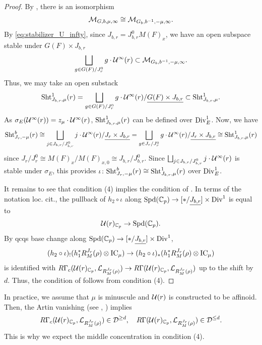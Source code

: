 \documentclass[12pt,reqno]{amsart}
\begin{document}
\begin{proof}
    By \cite[Corollary 23.3.2]{SW20}, there is an isomorphism
    \[
        {\mathcal{M}}_{G, b, \mu, \infty} \cong {\mathcal{M}}_{G_b, b^{-1}, -\mu, \infty}. 
    \]
    By \eqref{eq:stabilizer_U_infty}, since $J_{b, r} = J_{b, r}^0 M(F)_x$, we have an open subspace stable under $G(F) \times J_{b, r}$
    \[
        \bigsqcup_{g \in G(F) / J_{r}^0} g \cdot {\mathcal{U}}^\infty(r) \subset {\mathcal{M}}_{G_b, b^{-1}, -\mu, \infty}. 
    \]
    Thus, we may take an open substack 
    \[
        {\operatorname{Sht}}_{J_{b, r}, \mu}^1(r) = \bigsqcup_{g \in G(F) / J_{r}^0} g \cdot {\mathcal{U}}^\infty(r) / {\underline{G(F) \times J_{b, r}}} \subset {\operatorname{Sht}}_{J_{b, r}, \mu}^1.  
    \]
    As $\sigma_E({\mathcal{U}}^\infty(r)) = z_\mu \cdot {\mathcal{U}}^\infty(r)$, ${\operatorname{Sht}}_{J_{b, r}, \mu}^1(r)$ can be defined over ${\operatorname{Div}}^1_E$. Now, we have
    \[
        {\operatorname{Sht}}_{J_r, -\mu}^b(r) \cong \bigsqcup_{j \in J_{b, r} / J^0_{b, r}} j \cdot {\mathcal{U}}^\infty(r) / {\underline{J_r \times J_{b, r}}} =  \bigsqcup_{g \in J_{r} / J^0_{r}} g \cdot {\mathcal{U}}^\infty(r) / {\underline{J_r \times J_{b, r}}} \cong {\operatorname{Sht}}_{J_{b, r}, \mu}^1(r)
    \]
    since $J_r / J_r^0 \cong M(F)_x / M(F)_{x, 0} \cong J_{b, r} / J_{b, r}^0$. Since $\bigsqcup_{j \in J_{b, r} / J^0_{b, r}} j \cdot {\mathcal{U}}^\infty(r)$ is stable under $\sigma_E$, this provides $\iota \colon {\operatorname{Sht}}_{J_r, -\mu}^b(r) \cong {\operatorname{Sht}}_{J_{b, r}, \mu}^1(r)$ over ${\operatorname{Div}}^1_E$. 

    It remains to see that condition (4) implies the condition of . In terms of the notation loc. cit., the pullback of $h_2 \circ \iota$ along ${\operatorname{Spd}}(\mathbb{C}_p) \to [\ast / {\underline{J_{b, r}}}] \times {\operatorname{Div}}^1$ is equal to
    \[
        {\mathcal{U}}(r)_{\mathbb{C}_p} \to {\operatorname{Spd}}(\mathbb{C}_p). 
    \]
    By qcqs base change \cite[Proposition 17.6]{Sch17} along ${\operatorname{Spd}}(\mathbb{C}_p) \to [\ast / {\underline{J_{b, r}}}] \times {\operatorname{Div}}^1$,  
    \[
        (h_2 \circ \iota)_! (h_1^*R^{J_r}_M(\rho) \otimes {\operatorname{IC}}_\mu) \to (h_2 \circ \iota)_* (h_1^*R^{J_r}_M(\rho) \otimes {\operatorname{IC}}_\mu)
    \]
    is identified with $R\Gamma_c({\mathcal{U}}(r)_{\mathbb{C}_p}, {\mathcal{L}}_{R^{J_r}_M(\rho)}) \to R\Gamma({\mathcal{U}}(r)_{\mathbb{C}_p}, {\mathcal{L}}_{R^{J_r}_M(\rho)})$ up to the shift by $d$. Thus, the condition of  follows from condition (4). 
\end{proof}

\begin{rmk} \label{rmk:Artin_vanishing}
    In practice, we assume that $\mu$ is minuscule and ${\mathcal{U}}(r)$ is constructed to be affinoid. Then, the Artin vanishing (see \cite{Ber96}, \cite{Han20}) implies 
    \[
        R\Gamma_c({\mathcal{U}}(r)_{\mathbb{C}_p}, {\mathcal{L}}_{R^{J_r}_M(\rho)}) \in {\mathcal{D}}^{\geq d}, \quad 
        R\Gamma({\mathcal{U}}(r)_{\mathbb{C}_p}, {\mathcal{L}}_{R^{J_r}_M(\rho)}) \in {\mathcal{D}}^{\leq d}. 
    \]
    This is why we expect the middle concentration in condition (4). 
\end{rmk}
\end{document}
